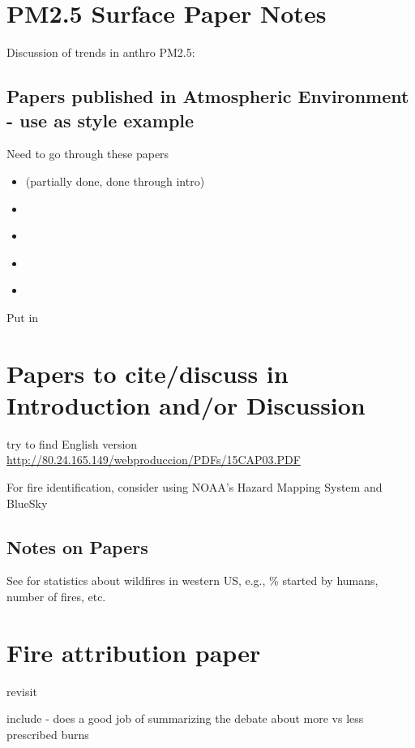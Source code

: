 \section{PM2.5 Surface Paper Notes}

Discussion of trends in anthro PM2.5: \cite{ridley_causes_2018}

\subsection{Papers published in Atmospheric Environment - use as style example}

Need to go through these papers
\begin{itemize}
\item \cite{BrokampExposure2017} (partially done, done through intro)
\item \cite{Sampson2013}
\item \cite{Anyenda2016}
\item \cite{Torvela2014}
\item \cite{Whiteman2014}
\end{itemize}

Put in \cite{BrokampExposure2017,larsen_impacts_2017}

\section{Papers to cite/discuss in Introduction and/or Discussion}

\cite{westerling_increasing_2016,WesterlingCorrection2016}

try to find English version \url{http://80.24.165.149/webproduccion/PDFs/15CAP03.PDF}

For fire identification, consider using NOAA's Hazard Mapping System and BlueSky

\subsection{Notes on Papers}

See \cite{Fusco2016} for statistics about wildfires in western US, e.g., \% started by humans, number of fires, etc.

\section{Fire attribution paper}

revisit \cite{schweizer_using_2017}

include \cite{long_aligning_2018} - does a good job of summarizing the debate about more vs less prescribed burns


